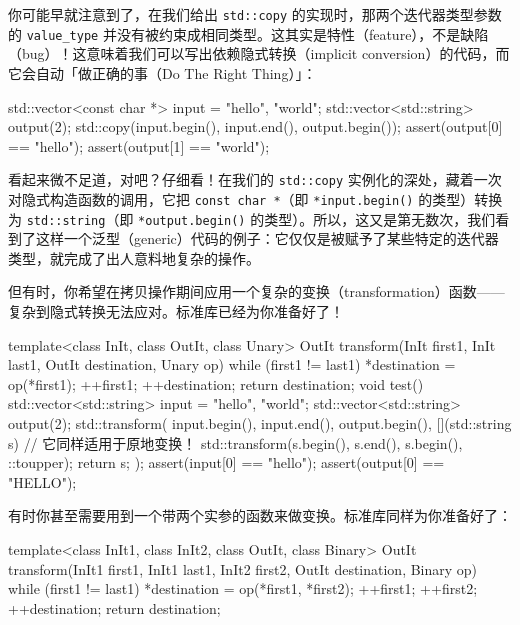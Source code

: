 你可能早就注意到了，在我们给出 \texttt{std::\allowbreak{}copy} 的实现时，那两个迭代器类型参数的 \texttt{value\_\allowbreak{}type} 并没有被约束成相同类型。这其实是特性（feature），不是缺陷（bug）！这意味着我们可以写出依赖隐式转换（implicit conversion）的代码，而它会自动「做正确的事（Do The Right Thing）」：

\begin{codebox}[cpp]
    std::vector<const char *> input = {"hello", "world"};
    std::vector<std::string> output(2);
    std::copy(input.begin(), input.end(), output.begin());
    assert(output[0] == "hello");
    assert(output[1] == "world");
\end{codebox}

看起来微不足道，对吧？仔细看！在我们的 \texttt{std::\allowbreak{}copy} 实例化的深处，藏着一次对隐式构造函数的调用，它把 \texttt{const char *}（即 \texttt{*input.\allowbreak{}begin(\allowbreak{})\allowbreak{}} 的类型）转换为 \texttt{std::\allowbreak{}string}（即 \texttt{*output.\allowbreak{}begin(\allowbreak{})\allowbreak{}} 的类型）。所以，这又是第无数次，我们看到了这样一个泛型（generic）代码的例子：它仅仅是被赋予了某些特定的迭代器类型，就完成了出人意料地复杂的操作。

但有时，你希望在拷贝操作期间应用一个复杂的变换（transformation）函数——复杂到隐式转换无法应对。标准库已经为你准备好了！

\begin{codebox}[cpp]
    template<class InIt, class OutIt, class Unary>
    OutIt transform(InIt first1, InIt last1, OutIt destination, Unary op)
    {
      while (first1 != last1) {
        *destination = op(*first1);
        ++first1;
        ++destination;
      }
      return destination;
    }
    void test()
    {
      std::vector<std::string> input = {"hello", "world"};
      std::vector<std::string> output(2);
      std::transform(
        input.begin(),
        input.end(),
        output.begin(),
        [](std::string s) {
          // 它同样适用于原地变换！
          std::transform(s.begin(), s.end(), s.begin(), ::toupper);
          return s;
        }
      );
      assert(input[0] == "hello");
      assert(output[0] == "HELLO");
    }
\end{codebox}

有时你甚至需要用到一个带两个实参的函数来做变换。标准库同样为你准备好了：

\begin{codebox}[cpp]
    template<class InIt1, class InIt2, class OutIt, class Binary>
    OutIt transform(InIt1 first1, InIt1 last1, InIt2 first2, OutIt
destination,
      Binary op)
    {
      while (first1 != last1) {
        *destination = op(*first1, *first2);
        ++first1;
        ++first2;
        ++destination;
      }
      return destination;
    }
\end{codebox}

